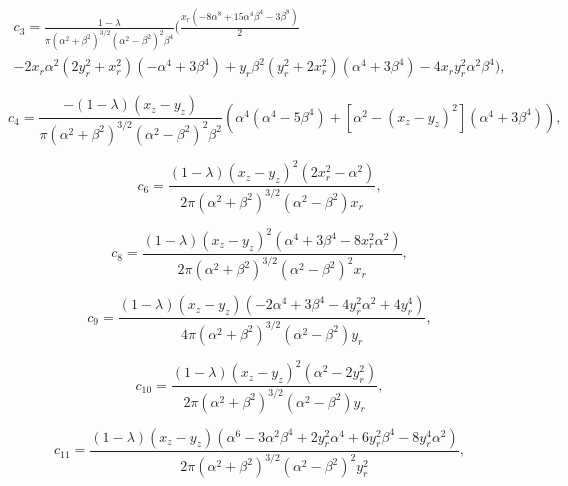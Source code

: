 \documentclass[12pt]{article}
\begin{document}
\begin{align}
\label{equ:coeff_a3}
c_{3} = \frac{1 - \lambda}{\pi (\alpha^{2} + \beta^{2})^{3/2} (\alpha^{2} - \beta^{2})^{2} \beta^{4}} \bigg( \frac{x_{r} (-8 \alpha^{8} + 15 \alpha^{4} \beta^{4} - 3 \beta^{8})}{2} \nonumber \\
- 2 x_{r} \alpha^{2} (2 y_{r}^{2} + x_{r}^{2}) (-\alpha^{4} + 3 \beta^{4}) + y_{r} \beta^{2} (y_{r}^{2} + 2 x_{r}^{2}) (\alpha^{4} + 3 \beta^{4}) - 4 x_{r} y_{r}^{2} \alpha^{2} \beta^{4} \bigg),
\end{align}

\begin{equation}
\label{equ:coeff_a4}
c_{4} = \frac{-(1 - \lambda) (x_{z} - y_{z})}{\pi (\alpha^{2} + \beta^{2})^{3/2} (\alpha^{2} - \beta^{2})^{2} \beta^{2}} \left(\alpha^{4} (\alpha^{4} - 5 \beta^{4}) + [\alpha^{2}- (x_{z} - y_{z})^{2}] (\alpha^{4} + 3 \beta^{4}) \right),
\end{equation}

\begin{equation}
\label{equ:coeff_a6}
c_{6} = \frac{(1 - \lambda) (x_{z} - y_{z})^{2} (2 x_{r}^{2} - \alpha^{2})}{2 \pi (\alpha^{2} + \beta^{2})^{3/2} (\alpha^{2} - \beta^{2}) x_{r}},
\end{equation}

\begin{equation}
\label{equ:coeff_a8}
c_{8} = \frac{(1 - \lambda) (x_{z} - y_{z})^{2} (\alpha^{4} + 3 \beta^{4} - 8 x_{r}^{2} \alpha^{2})}{2 \pi (\alpha^{2} + \beta^{2})^{3/2} (\alpha^{2} - \beta^{2})^{2} x_{r}},
\end{equation}

\begin{equation}
\label{equ:coeff_a9}
c_{9} = \frac{(1 - \lambda) (x_{z} - y_{z}) (-2 \alpha^{4} + 3 \beta^{4} - 4 y_{r}^{2} \alpha^{2} + 4 y_{r}^{4})}{4 \pi (\alpha^{2} + \beta^{2})^{3/2} (\alpha^{2} - \beta^{2}) y_{r}},
\end{equation}

\begin{equation}
\label{equ:coeff_a10}
c_{10} = \frac{(1 - \lambda) (x_{z} - y_{z})^{2} (\alpha^{2} - 2 y_{r}^{2})}{2 \pi (\alpha^{2} + \beta^{2})^{3/2} (\alpha^{2} - \beta^{2}) y_{r}},
\end{equation}

\begin{equation}
\label{equ:coeff_a11}
c_{11} = \frac{(1 - \lambda) (x_{z} - y_{z}) (\alpha^{6} - 3 \alpha^{2} \beta^{4} + 2 y_{r}^{2} \alpha^{4} + 6 y_{r}^{2} \beta^{4} - 8 y_{r}^{4} \alpha^{2})}{2 \pi (\alpha^{2} + \beta^{2})^{3/2} (\alpha^{2} - \beta^{2})^{2} y_{r}^{2}},
\end{equation}
\end{document}
